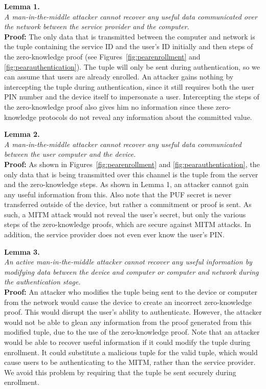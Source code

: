 \noindent \textbf{Lemma 1.} \\
\noindent \emph{A man-in-the-middle attacker cannot recover any useful data communicated over the network between the
service provider and the computer.} \\
{\bf Proof:}  The only data that is transmitted between the computer and network is the tuple containing the service
ID and the user's ID initially and then steps of the zero-knowledge proof (see Figures~\ref{fig:pearenrollment} and
\ref{fig:pearauthentication}). The tuple will only be sent during authentication, so we can assume that users are already enrolled.
An attacker gains nothing by intercepting the tuple during authentication, since it still requires both the user PIN
number and the device itself to impersonate a user. Intercepting the steps of the zero-knowledge proof also gives him
no information since these zero-knowledge protocols do not reveal any information about the committed value.

\noindent \textbf{Lemma 2.} \\
\noindent \emph{A man-in-the-middle attacker cannot recover any useful data communicated between the user computer and
the device.} \\
{\bf Proof:}  As shown in Figures~\ref{fig:pearenrollment} and \ref{fig:pearauthentication}, the only data that is being transmitted over this channel is
the tuple from the server and the zero-knowledge steps. As shown in Lemma 1, an attacker cannot gain any useful
information from this. 
Also note that the PUF secret is never transferred outside of the device, but rather a commitment or
proof is sent. As such, a MITM attack would not reveal the user's secret, but only the various steps of
the zero-knowledge proofs, which are secure against MITM attacks. In addition, the service provider does not even ever
know the user's PIN.%

\noindent \textbf{Lemma 3.} \\
\noindent \emph{An active man-in-the-middle attacker cannot recover any useful information by modifying data between
the device and computer or computer and network during the authentication stage.} \\
{\bf Proof:}  An attacker who modifies the tuple being sent to the device or computer from the network would cause the
device to create an incorrect zero-knowledge proof. This would disrupt the user's ability to authenticate. However,
the attacker would not be able to glean any information from the proof generated from this modified tuple, due to the
use of the zero-knowledge proof.
Note that an attacker would be able to recover useful information if it could modify the tuple during enrollment. It
could substitute a malicious tuple for the valid tuple, which would cause users to be authenticating to the MITM, rather
than the service provider. We avoid this problem by requiring that the tuple be sent securely during enrollment.


